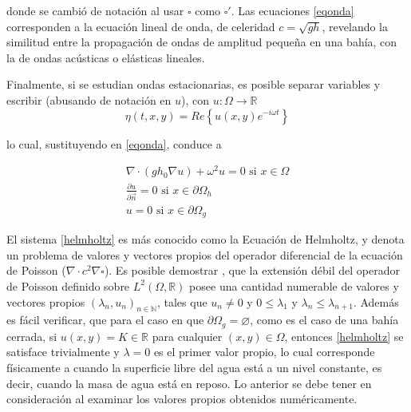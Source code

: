     donde se cambi\'o de notaci\'on al usar $\square$ como $\square'$. Las ecuaciones \eqref{eqonda} corresponden a la ecuaci\'on lineal de onda,  de celeridad $c=\sqrt{gh}$, revelando la similitud entre la propagaci\'on de ondas de amplitud peque\~na en una bah\'ia, con la de ondas ac\'usticas o el\'asticas lineales.
    
    Finalmente, si se estudian ondas estacionarias, es posible separar variables y escribir (abusando de notaci\'on en $u$), con $u:\Omega \rightarrow \mathbb{R}$
    \begin{equation}
    	\eta(t,x,y) =Re\left\{ u(x,y) e^{-i \omega t}\right\}
    \end{equation}
    
    lo cual, sustituyendo en \eqref{eqonda}, conduce a 
    
    \begin{equation}
      \begin{split}
    	\nabla \cdot \left( gh_0 \nabla u\right) + \omega^2 u = 0 \text{ si } x \in \Omega\\
        \frac{\partial u}{\partial \vec n} = 0 \text{ si } x \in \partial \Omega_h \\
        u = 0 \text{ si } x \in \partial \Omega_g
      \end{split}
        \label{helmholtz}
    \end{equation}
    
    El sistema \eqref{helmholtz} es m\'as conocido como la Ecuaci\'on de Helmholtz, y denota un problema de valores y vectores propios del operador diferencial de la ecuaci\'on de Poisson ($\nabla \cdot c^2 \nabla \square$). Es posible demostrar \cite{nica2011}, que la extensi\'on d\'ebil del operador de Poisson definido sobre $L^2(\Omega,\mathbb{R})$ posee una cantidad numerable de valores y vectores propios $(\lambda_n, u_n)_{n\in\mathbb{N}}$, tales que $u_n\neq 0$ y $0\leq \lambda_1$ y $\lambda_n \leq \lambda_{n+1}$. Adem\'as es f\'acil verificar, que para el caso en que $ \partial \Omega _g = \varnothing$, como es el caso de una bah\'ia cerrada, si $u(x,y)=K \in \mathbb{R}$ para cualquier $(x,y)\in\Omega$, entonces \eqref{helmholtz} se satisface trivialmente y $\lambda=0$ es el primer valor propio, lo cual corresponde f\'isicamente a cuando la superficie libre del agua est\'a a un nivel constante, es decir, cuando la masa de agua est\'a en reposo. Lo anterior se debe tener en consideraci\'on al examinar los valores propios obtenidos num\'ericamente.
%     
    
    